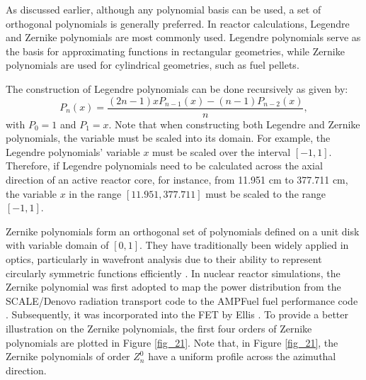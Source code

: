 As discussed earlier, although any polynomial basis can be used, a set of orthogonal polynomials is generally preferred. In reactor calculations, Legendre and Zernike polynomials are most commonly used. Legendre polynomials serve as the basis for approximating functions in rectangular geometries, while Zernike polynomials are used for cylindrical geometries, such as fuel pellets.

The construction of Legendre polynomials can be done recursively as given by:
\begin{equation}
    P_n\left(x\right)=\frac{\left(2n-1\right)xP_{n-1}\left(x\right)-\left(n-1\right)P_{n-2}\left(x\right)}{n},
\end{equation}
with $P_0=1$ and $P_1=x$. Note that when constructing both Legendre and Zernike polynomials, the variable must be scaled into its domain. For example, the Legendre polynomials' variable $x$ must be scaled over the interval $[-1, 1]$. Therefore, if Legendre polynomials need to be calculated across the axial direction of an active reactor core, for instance, from 11.951 cm to 377.711 cm, the variable $x$ in the range $[11.951, 377.711]$ must be scaled to the range $[-1, 1]$.

Zernike polynomials form an orthogonal set of polynomials defined on a unit disk with variable domain of $[0, 1]$. They have traditionally been widely applied in optics, particularly in wavefront analysis due to their ability to represent circularly symmetric functions efficiently \cite{wang80}. In nuclear reactor simulations, the Zernike polynomial was first adopted to map the power distribution from the SCALE/Denovo radiation transport code to the AMPFuel fuel performance code \cite{hamilton}. Subsequently, it was incorporated into the FET by Ellis \cite{ellis}. To provide a better illustration on the Zernike polynomials, the first four orders of Zernike polynomials are plotted in Figure \ref{fig_21}. Note that, in Figure \ref{fig_21}, the Zernike polynomials of order $Z_n^0$ have a uniform profile across the azimuthal direction.


